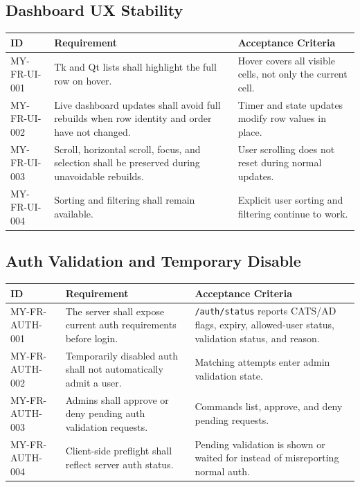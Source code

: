 \documentclass[12pt,a4paper]{article}
\begin{document}
\subsection{Dashboard UX Stability}

\begin{longtable}{L{0.18\textwidth} L{0.47\textwidth} L{0.25\textwidth}}
\textbf{ID} & \textbf{Requirement} & \textbf{Acceptance Criteria} \\
\hline
MY-FR-UI-001 & Tk and Qt lists shall highlight the full row on hover. & Hover covers all visible cells, not only the current cell. \\
MY-FR-UI-002 & Live dashboard updates shall avoid full rebuilds when row identity and order have not changed. & Timer and state updates modify row values in place. \\
MY-FR-UI-003 & Scroll, horizontal scroll, focus, and selection shall be preserved during unavoidable rebuilds. & User scrolling does not reset during normal updates. \\
MY-FR-UI-004 & Sorting and filtering shall remain available. & Explicit user sorting and filtering continue to work. \\
\end{longtable}

\subsection{Auth Validation and Temporary Disable}

\begin{longtable}{L{0.18\textwidth} L{0.47\textwidth} L{0.25\textwidth}}
\textbf{ID} & \textbf{Requirement} & \textbf{Acceptance Criteria} \\
\hline
MY-FR-AUTH-001 & The server shall expose current auth requirements before login. & \texttt{/auth/status} reports CATS/AD flags, expiry, allowed-user status, validation status, and reason. \\
MY-FR-AUTH-002 & Temporarily disabled auth shall not automatically admit a user. & Matching attempts enter admin validation state. \\
MY-FR-AUTH-003 & Admins shall approve or deny pending auth validation requests. & Commands list, approve, and deny pending requests. \\
MY-FR-AUTH-004 & Client-side preflight shall reflect server auth status. & Pending validation is shown or waited for instead of misreporting normal auth. \\
\end{longtable}
\end{document}
